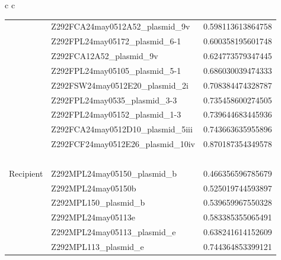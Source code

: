 \documentclass[conference]{IEEEtran}
\begin{document}
\begin{table}[]
\begin{tabular}{ c c}
\begin{tabular}{l l l}
&	Z292FCA24may0512A52\_plasmid\_9v	&	0.598113613864758	\\
&	Z292FPL24may05172\_plasmid\_6-1	&	0.600358195601748	\\
&	Z292FCA12A52\_plasmid\_9v	&	0.624773579347445	\\
&	Z292FPL24may05105\_plasmid\_5-1	&	0.686030039474333	\\
&	Z292FSW24may0512E20\_plasmid\_2i	&	0.708384474328787	\\
&	Z292FPL24may0535\_plasmid\_3-3	&	0.735458600274505	\\
&	Z292FPL24may05152\_plasmid\_1-3	&	0.739644683445936	\\
&	Z292FCA24may0512D10\_plasmid\_5iii	&	0.743663635955896	\\
&	Z292FCF24may0512E26\_plasmid\_10iv	&	0.870187354349578	\\

	& \ &\ \\
	\hline
Recipient &	Z292MPL24may05150\_plasmid\_b	&	0.466356596785679	\\
&	Z292MPL24may05150b	&	0.525019744593897	\\
&	Z292MPL150\_plasmid\_b	&	0.539659967550328	\\
&	Z292MPL24may05113e	&	0.583385355065491	\\
&	Z292MPL24may05113\_plasmid\_e	&	0.638241614152609	\\
&	Z292MPL113\_plasmid\_e	&	0.744364853399121	\\

\end{tabular}\\
	\end{tabular}
\end{table}
\end{document}
